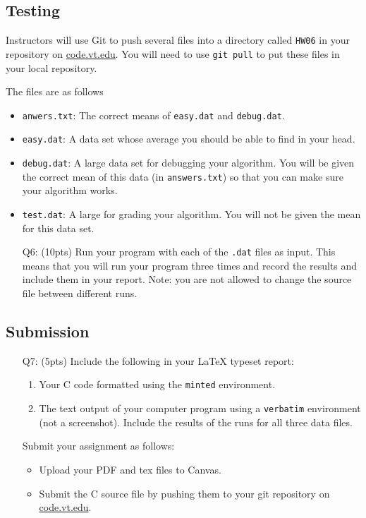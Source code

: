 \subsection*{Testing}
Instructors will use Git to push several files into a directory called \texttt{HW06} in your repository on \href{http://code.vt.edu}{code.vt.edu}.
You will need to use \texttt{git pull} to put these files in your local repository.

The files are as follows


\begin{itemize}
    \item \texttt{anwers.txt}: The correct means of \texttt{easy.dat} and \texttt{debug.dat}.
    \item \texttt{easy.dat}: A data set whose average you should be able to find in your head.
    \item \texttt{debug.dat}: A large data set for debugging your algorithm.
    You will be given the correct mean of this data (in \texttt{answers.txt}) so that you can make sure your algorithm works.
    \item \texttt{test.dat}: A large for grading your algorithm.
    You will not be given the mean for this data set.
    \item[Q6:] (10pts) Run your program with each of the \texttt{.dat} files as input.
    This means that you will run your program three times and record the results and include them in your report.  Note: you are not allowed to change the source file between different runs.
\end{itemize}

\subsection*{Submission}
\begin{itemize}
    \item[Q7:] (5pts) Include the following in your \LaTeX{} typeset report:
    \begin{enumerate}
        \item Your C code formatted using the \texttt{minted} environment.
        \item The text output of your computer program using a \texttt{verbatim} environment (not a screenshot). Include the results of the runs for all three data files.
    \end{enumerate}
 
    Submit your assignment as follows:
    \begin{itemize}
    \item Upload your PDF and tex files to Canvas.
    \item Submit the C source file by pushing them to your git repository on \href{http://code.vt.edu}{code.vt.edu}.
    \end{itemize}
\end{itemize}
